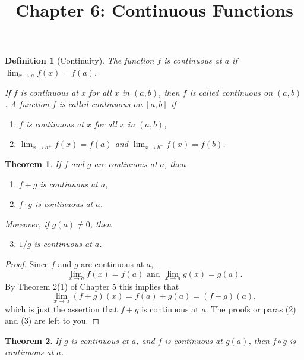 \documentclass{article}
\newtheorem{definition}{Definition}
\newtheorem{theorem}{Theorem}
\begin{document}
\title{Chapter 6: Continuous Functions}
\maketitle

\begin{definition}[Continuity]
  The function $f$ is \emph{continuous at $a$} if $\lim_{x \rightarrow a}f(x)
  = f(a)$.

  If $f$ is continuous at $x$ for all $x$ in $(a, b)$, then $f$ is called
  \emph{continuous on $(a, b)$}. A function $f$ is called \emph{continuous on
  $[a, b]$} if \begin{enumerate}
    \item $f$ is continuous at $x$ for all $x$ in $(a, b)$,
    \item $\lim_{x \rightarrow a^+}f(x) = f(a)$ and $\lim_{x \rightarrow b^-}
      f(x) = f(b)$.
  \end{enumerate}
\end{definition}

\begin{theorem}
  If $f$ and $g$ are continuous at $a$, then \begin{enumerate}
    \item $f + g$ is continuous at $a$,
    \item $f \cdot g$ is continuous at $a$.
  \end{enumerate}
  Moreover, if $g(a) \neq 0$, then \begin{enumerate}
    \setcounter{enumi}{2}
    \item $1/g$ is continuous at $a$.
  \end{enumerate}
\end{theorem}

\begin{proof}
  Since $f$ and $g$ are continuous at $a$, \begin{equation*}
    \lim_{x \rightarrow a}f(x) = f(a) \text{ and } \lim_{x \rightarrow a}g(x)
    = g(a).
  \end{equation*}
  By Theorem 2(1) of Chapter 5 this implies that \begin{equation*}
    \lim_{x \rightarrow a}(f + g)(x) = f(a) + g(a) = (f + g)(a),
  \end{equation*}
  which is just the assertion that $f + g$ is continuous at $a$. The proofs or
  paras (2) and (3) are left to you.
\end{proof}

\begin{theorem}
  If $g$ is continuous at $a$, and $f$ is continuous at $g(a)$, then $f \circ
  g$ is continuous at $a$.
\end{theorem}
\end{document}
